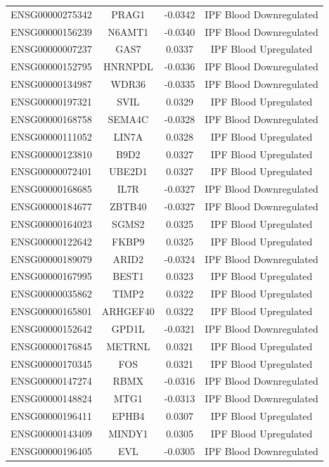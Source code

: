 \documentclass[
]{article}
\begin{document}
\begin{singlespace}
\begin{longtable}[t]{lccc}
ENSG00000275342 & PRAG1 & -0.0342 & IPF Blood Downregulated\\
ENSG00000156239 & N6AMT1 & -0.0340 & IPF Blood Downregulated\\
ENSG00000007237 & GAS7 & 0.0337 & IPF Blood Upregulated\\
ENSG00000152795 & HNRNPDL & -0.0336 & IPF Blood Downregulated\\
ENSG00000134987 & WDR36 & -0.0335 & IPF Blood Downregulated\\
\addlinespace
ENSG00000197321 & SVIL & 0.0329 & IPF Blood Upregulated\\
ENSG00000168758 & SEMA4C & -0.0328 & IPF Blood Downregulated\\
ENSG00000111052 & LIN7A & 0.0328 & IPF Blood Upregulated\\
ENSG00000123810 & B9D2 & 0.0327 & IPF Blood Upregulated\\
ENSG00000072401 & UBE2D1 & 0.0327 & IPF Blood Upregulated\\
\addlinespace
ENSG00000168685 & IL7R & -0.0327 & IPF Blood Downregulated\\
ENSG00000184677 & ZBTB40 & -0.0327 & IPF Blood Downregulated\\
ENSG00000164023 & SGMS2 & 0.0325 & IPF Blood Upregulated\\
ENSG00000122642 & FKBP9 & 0.0325 & IPF Blood Upregulated\\
ENSG00000189079 & ARID2 & -0.0324 & IPF Blood Downregulated\\
\addlinespace
ENSG00000167995 & BEST1 & 0.0323 & IPF Blood Upregulated\\
ENSG00000035862 & TIMP2 & 0.0322 & IPF Blood Upregulated\\
ENSG00000165801 & ARHGEF40 & 0.0322 & IPF Blood Upregulated\\
ENSG00000152642 & GPD1L & -0.0321 & IPF Blood Downregulated\\
ENSG00000176845 & METRNL & 0.0321 & IPF Blood Upregulated\\
\addlinespace
ENSG00000170345 & FOS & 0.0321 & IPF Blood Upregulated\\
ENSG00000147274 & RBMX & -0.0316 & IPF Blood Downregulated\\
ENSG00000148824 & MTG1 & -0.0313 & IPF Blood Downregulated\\
ENSG00000196411 & EPHB4 & 0.0307 & IPF Blood Upregulated\\
ENSG00000143409 & MINDY1 & 0.0305 & IPF Blood Upregulated\\
\addlinespace
ENSG00000196405 & EVL & -0.0305 & IPF Blood Downregulated\\

\end{longtable}
\end{singlespace}
\end{document}
